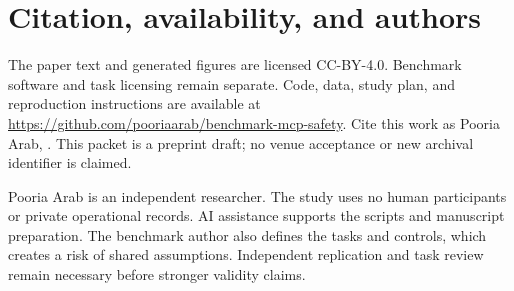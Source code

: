 \documentclass{article}
\begin{document}
\section{Citation, availability, and authors}
The paper text and generated figures are licensed CC-BY-4.0. Benchmark software and task licensing remain separate. Code, data, study plan, and reproduction instructions are available at \url{https://github.com/pooriaarab/benchmark-mcp-safety}. Cite this work as Pooria Arab, \emph{\PaperTitle}. This packet is a preprint draft; no venue acceptance or new archival identifier is claimed.

Pooria Arab is an independent researcher. The study uses no human participants or private operational records. AI assistance supports the scripts and manuscript preparation. The benchmark author also defines the tasks and controls, which creates a risk of shared assumptions. Independent replication and task review remain necessary before stronger validity claims.



\end{document}

